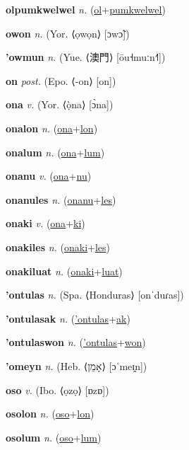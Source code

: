 \textbf{\hypertarget{olpumkwelwel}{olpumkwelwel}} \textit{n.} (\hyperlink{ol}{ol}+\allowbreak \hyperlink{pumkwelwel}{pumkwelwel})


\textbf{\hypertarget{owon}{owon}} \textit{n.} (Yor. ⟨ọwọn⟩ [ɔwɔ̃])


\textbf{\hypertarget{'owmun}{'owmun}} \textit{n.} (Yue. ⟨{\chinese{}澳門}⟩ [ōu˧muːn˧˥])


\textbf{\hypertarget{on}{on}} \textit{post.} (Epo. ⟨-on⟩ [on])


\textbf{\hypertarget{ona}{ona}} \textit{v.} (Yor. ⟨ọ̀na⟩ [ɔ̀na])


\textbf{\hypertarget{onalon}{onalon}} \textit{n.} (\hyperlink{ona}{ona}+\allowbreak \hyperlink{lon}{lon})


\textbf{\hypertarget{onalum}{onalum}} \textit{n.} (\hyperlink{ona}{ona}+\allowbreak \hyperlink{lum}{lum})


\textbf{\hypertarget{onanu}{onanu}} \textit{v.} (\hyperlink{ona}{ona}+\allowbreak \hyperlink{nu}{nu})


\textbf{\hypertarget{onanules}{onanules}} \textit{n.} (\hyperlink{onanu}{onanu}+\allowbreak \hyperlink{les}{les})


\textbf{\hypertarget{onaki}{onaki}} \textit{v.} (\hyperlink{ona}{ona}+\allowbreak \hyperlink{ki}{ki})


\textbf{\hypertarget{onakiles}{onakiles}} \textit{n.} (\hyperlink{onaki}{onaki}+\allowbreak \hyperlink{les}{les})


\textbf{\hypertarget{onakiluat}{onakiluat}} \textit{n.} (\hyperlink{onaki}{onaki}+\allowbreak \hyperlink{luat}{luat})


\textbf{\hypertarget{'ontulas}{'ontulas}} \textit{n.} (Spa. ⟨Honduras⟩ [onˈduɾas])


\textbf{\hypertarget{'ontulasak}{'ontulasak}} \textit{n.} (\hyperlink{'ontulas}{'ontulas}+\allowbreak \hyperlink{ak}{ak})


\textbf{\hypertarget{'ontulaswon}{'ontulaswon}} \textit{n.} (\hyperlink{'ontulas}{'ontulas}+\allowbreak \hyperlink{won}{won})


\textbf{\hypertarget{'omeyn}{'omeyn}} \textit{n.} (Heb. ⟨{\hebrew{}אָמֵן}⟩ [ɔˈmeɪ̯n])


\textbf{\hypertarget{oso}{oso}} \textit{v.} (Ibo. ⟨ọzọ⟩ [ɒzɒ])


\textbf{\hypertarget{osolon}{osolon}} \textit{n.} (\hyperlink{oso}{oso}+\allowbreak \hyperlink{lon}{lon})


\textbf{\hypertarget{osolum}{osolum}} \textit{n.} (\hyperlink{oso}{oso}+\allowbreak \hyperlink{lum}{lum})


